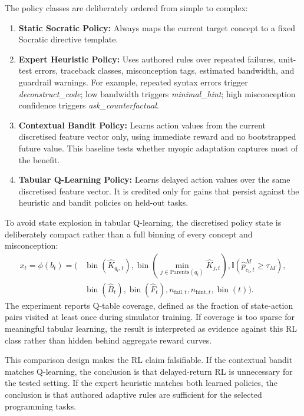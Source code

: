 \documentclass[11pt,a4paper]{report}
\begin{document}
The policy classes are deliberately ordered from simple to complex:
\begin{enumerate}
    \item \textbf{Static Socratic Policy:} Always maps the current target concept to a fixed Socratic directive template.
    \item \textbf{Expert Heuristic Policy:} Uses authored rules over repeated failures, unit-test errors, traceback classes, misconception tags, estimated bandwidth, and guardrail warnings. For example, repeated syntax errors trigger \textit{deconstruct\_code}; low bandwidth triggers \textit{minimal\_hint}; high misconception confidence triggers \textit{ask\_counterfactual}.
    \item \textbf{Contextual Bandit Policy:} Learns action values from the current discretised feature vector only, using immediate reward and no bootstrapped future value. This baseline tests whether myopic adaptation captures most of the benefit.
    \item \textbf{Tabular Q-Learning Policy:} Learns delayed action values over the same discretised feature vector. It is credited only for gains that persist against the heuristic and bandit policies on held-out tasks.
\end{enumerate}

To avoid state explosion in tabular Q-learning, the discretised policy state is deliberately compact rather than a full binning of every concept and misconception:
\begin{equation}
    \begin{aligned}
    x_t = \phi(b_t) = \big(&
    \operatorname{bin}(\hat{K}_{q_t,t}),
    \operatorname{bin}\left(\min_{j\in \text{Parents}(q_t)}\hat{K}_{j,t}\right),
    \mathbb{I}(\hat{p}^{M}_{c_t,t} \ge \tau_M),\\
    &
    \operatorname{bin}(\hat{B}_t),
    \operatorname{bin}(\hat{F}_t),
    n_{\text{fail},t},
    n_{\text{hint},t},
    \operatorname{bin}(t)
    \big).
    \end{aligned}
\end{equation}
The experiment reports Q-table coverage, defined as the fraction of state-action pairs visited at least once during simulator training. If coverage is too sparse for meaningful tabular learning, the result is interpreted as evidence against this RL class rather than hidden behind aggregate reward curves.

This comparison design makes the RL claim falsifiable. If the contextual bandit matches Q-learning, the conclusion is that delayed-return RL is unnecessary for the tested setting. If the expert heuristic matches both learned policies, the conclusion is that authored adaptive rules are sufficient for the selected programming tasks.
\end{document}
